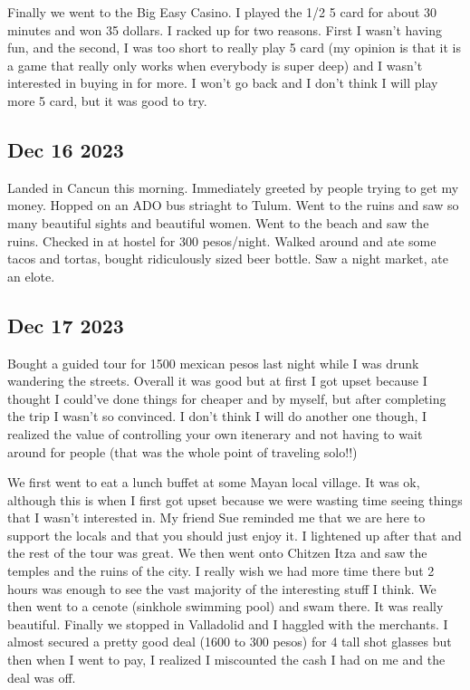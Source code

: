 \documentclass[12pt]{article}
\begin{document}
\hfill

Finally we went to the Big Easy Casino. I played the 1/2 5 card for about 30 minutes and won 35 dollars.
I racked up for two reasons. First I wasn't having fun, and the second, I was too short to really play 5 card
(my opinion is that it is a game that really only works when everybody is super deep) and I wasn't interested in
buying in for more. I won't go back and I don't think I will play more 5 card, but it was good to try.

\subsection{Dec 16 2023}
Landed in Cancun this morning. Immediately greeted by people trying to get my money.
Hopped on an ADO bus striaght to Tulum. Went to the ruins and saw so many beautiful sights and 
beautiful women. Went to the beach and saw the ruins. Checked in at hostel for 300 pesos/night. 
Walked around and ate some tacos and tortas, bought ridiculously sized beer bottle. Saw a night market, ate an elote.

\subsection{Dec 17 2023}
Bought a guided tour for 1500 mexican pesos last night while I was drunk wandering the streets. Overall it was good but 
at first I got upset because I thought I could've done things for cheaper and by myself, but 
after completing the trip I wasn't so convinced. I don't think I will do another one though, I realized
the value of controlling your own itenerary and not having to wait around for people (that was the whole point of traveling solo!!)

\hfill

We first went to eat a lunch buffet at some Mayan local village. It was ok, although this is when I first got
upset because we were wasting time seeing things that I wasn't interested in. My friend Sue reminded me that
we are here to support the locals and that you should just enjoy it. I lightened up after that and the rest of 
the tour was great. We then went onto Chitzen Itza and saw the temples and the ruins of the city. I really
wish we had more time there but 2 hours was enough to see the vast majority of the interesting stuff I think. We then went
to a cenote (sinkhole swimming pool) and swam there. It was really beautiful. Finally we stopped in Valladolid
and I haggled with the merchants. I almost secured a pretty good deal (1600 to 300 pesos) for 4 tall shot glasses but then 
when I went to pay, I realized I miscounted the cash I had on me and the deal was off.
\end{document}
